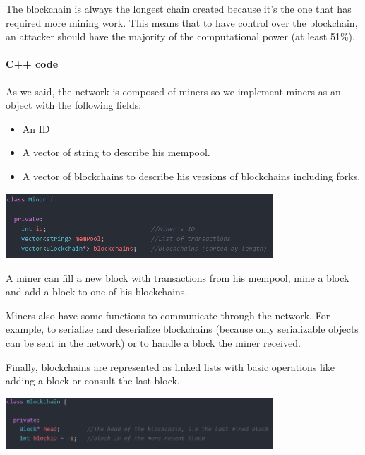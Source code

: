   The blockchain is always the longest chain created because it's the one that has required more mining work. This means that to have control over the blockchain, an attacker should have the majority of the computational power (at least 51\%). \newline

  \begin{aside}

  \paragraph{C++ code}

  As we said, the network is composed of miners so we implement miners as an object with the following fields: \newline

  \begin{itemize}
    \item An ID
    \item A vector of string to describe his mempool.
    \item A vector of blockchains to describe his versions of blockchains including forks.
  \end{itemize}
  \medskip

  \clearpage

  \medskip
  \includegraphics[width=10cm]{Figures/ClassMiner}
  \medskip

  A miner can fill a new block with transactions from his mempool, mine a block and add a block to one of his blockchains.

  Miners also have some functions to communicate through the network. For example, to serialize and deserialize blockchains (because only serializable objects can be sent in the network) or to handle a block the miner received. \newline

  Finally, blockchains are represented as linked lists with basic operations like adding a block or consult the last block. \newline

  \includegraphics[width=10cm]{Figures/ClassBlockchain}

  \end{aside}
  \medskip


